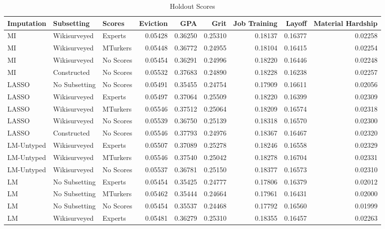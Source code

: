 \begin{table}[ht]
\scriptsize
\centering
\caption{Holdout Scores} 
\label{tab_holdout}
\begin{tabular}{lllrrrrrr}
  \toprule
Imputation & Subsetting & Scores & Eviction & GPA & Grit & Job Training & Layoff & Material Hardship \\ 
  \midrule
MI & Wikisurveyed & Experts & 0.05428 & 0.36250 & 0.25310 & 0.18137 & 0.16377 & 0.02258 \\ 
  MI & Wikisurveyed & MTurkers & 0.05448 & 0.36772 & 0.24955 & 0.18104 & 0.16415 & 0.02254 \\ 
  MI & Wikisurveyed & No Scores & 0.05454 & 0.36291 & 0.24996 & 0.18220 & 0.16446 & 0.02248 \\ 
  MI & Constructed & No Scores & 0.05532 & 0.37683 & 0.24890 & 0.18228 & 0.16238 & 0.02257 \\ 
  LASSO & No Subsetting & No Scores & 0.05491 & 0.35455 & 0.24754 & 0.17909 & 0.16611 & 0.02056 \\ 
  LASSO & Wikisurveyed & Experts & 0.05497 & 0.37064 & 0.25509 & 0.18220 & 0.16399 & 0.02309 \\ 
  LASSO & Wikisurveyed & MTurkers & 0.05546 & 0.37512 & 0.25064 & 0.18209 & 0.16574 & 0.02318 \\ 
  LASSO & Wikisurveyed & No Scores & 0.05539 & 0.36750 & 0.25139 & 0.18318 & 0.16570 & 0.02300 \\ 
  LASSO & Constructed & No Scores & 0.05546 & 0.37793 & 0.24976 & 0.18367 & 0.16467 & 0.02320 \\ 
  LM-Untyped & Wikisurveyed & Experts & 0.05507 & 0.37089 & 0.25278 & 0.18246 & 0.16558 & 0.02329 \\ 
  LM-Untyped & Wikisurveyed & MTurkers & 0.05546 & 0.37540 & 0.25042 & 0.18278 & 0.16704 & 0.02331 \\ 
  LM-Untyped & Wikisurveyed & No Scores & 0.05537 & 0.36781 & 0.25150 & 0.18377 & 0.16573 & 0.02310 \\ 
  LM & No Subsetting & Experts & 0.05454 & 0.35425 & 0.24777 & 0.17806 & 0.16379 & 0.02012 \\ 
  LM & No Subsetting & MTurkers & 0.05462 & 0.35444 & 0.24664 & 0.17961 & 0.16431 & 0.02000 \\ 
  LM & No Subsetting & No Scores & 0.05454 & 0.35537 & 0.24468 & 0.17792 & 0.16560 & 0.01999 \\ 
  LM & Wikisurveyed & Experts & 0.05481 & 0.36279 & 0.25310 & 0.18355 & 0.16457 & 0.02263 \\ 

\end{tabular}
\end{table}
